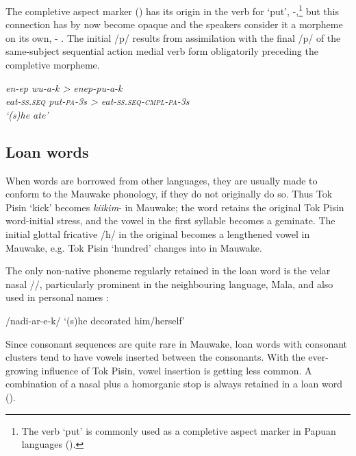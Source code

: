 The completive aspect marker () has its origin in the verb for `put', \nobreakdash-,\footnote{The verb `put' is commonly used as a completive aspect marker in Papuan languages ().} but this connection has by now become opaque and the speakers consider it a morpheme on its own, - .  The initial /p/ results from assimilation with the final /p/ of the same-subject sequential action medial verb form obligatorily preceding the completive morpheme.

\ea
\label{ex:2:completive}
\gll\itshape en-ep  \itshape wu-a-k  {\upshape \textgreater}  \itshape enep-pu-a-k \\ 
eat-\textsc{ss}.\textsc{seq}  put-\textsc{pa}-3s  {{\textgreater}}  eat-\textsc{ss}.\textsc{seq}-\textsc{cmpl}-\textsc{pa}-3s\\
\glt `(s)he ate'
\z

\subsection{Loan words}

When words are borrowed from other languages, they are usually made to conform to the Mauwake phonology, if they do not originally do so.  Thus Tok Pisin  `kick' becomes \textit{kiikim}- in Mauwake; the word retains the original Tok Pisin word-initial stress, and the vowel in the first syllable becomes a geminate.  The initial glottal fricative /h/ in the original becomes a lengthened vowel in Mauwake, e.g. Tok Pisin  `hundred' changes into   in Mauwake.

The only non-native phoneme regularly retained in the loan word is the velar nasal /{\ng}/, particularly prominent in the neighbouring language, Mala, and also used in personal names :

\ea
\label{ex:2:Malaloan}
/nadi{\ng-ar-e-k/}  `(s)he decorated him/herself'
\z

Since consonant sequences are quite rare in Mauwake, loan words with consonant clusters tend to have vowels inserted between the consonants.  With the ever-growing influence of Tok Pisin, vowel insertion is getting less common.  A combination of a nasal plus a homorganic stop is always retained in a loan word ().


